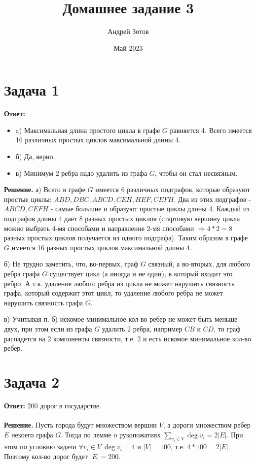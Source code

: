 \documentclass{article}
\title{Домашнее задание 3}
\author{Андрей Зотов}
\date{Май 2023}
\begin{document}
\maketitle

\section*{Задача 1}
{\bf Ответ:}
\begin{itemize}
\item a) Максимальная длина простого цикла в графе $G$ равняется 4. Всего имеется 16 различных простых циклов максимальной длины 4.
\item б) Да, верно.
\item в) Минимум 2 ребра надо удалить из графа $G$, чтобы он стал несвязным.
\end{itemize}
{\bf Решение.} а) Всего в графе $G$ имеется 6 различных подграфов, которые образуют простые циклы: $ABD, DBC, ABCD, CEH, HEF, CEFH$. Два из этих подграфов - $ABCD, CEFH$ - самые большие и образуют простые циклы длины 4. Каждый из подграфов длины 4 дает 8 разных простых циклов (стартовую вершину цикла можно выбрать 4-мя способами и направление 2-мя способами $\Rightarrow 4 * 2 = 8$ разных простых циклов получается из одного подграфа). Таким образом в графе $G$ имеется 16 разных простых циклов максимальной длины 4.
\par
б) Не трудно заметить, что, во-первых, граф $G$ связный, а во-вторых, для любого ребра графа $G$ существует цикл (а иногда и не один), в который входит это ребро. А т.к. удаление любого ребра из цикла не может нарушить связность графа, который содержит этот цикл, то удаление любого ребра не может нарушить связность графа $G$.
\par
в) Учитывая п. б) искомое минимальное кол-во ребер не может быть меньше двух, при этом если из графа $G$ удалить 2 ребра, например $CB$ и $CD$, то граф распадется на 2 компоненты связности, т.е. 2 и есть искомое минимальное кол-во ребер.
\section*{Задача 2}
{\bf Ответ:} 200 дорог в государстве.
\\
\\
{\bf Решение.} Пусть города будут множеством вершин $V$, а дороги множеством ребер $E$ некоего графа $G$. Тогда по лемме о рукопожатиях $\sum_{v_i \in V}\deg{v_i} = 2 |E|$. При этом по условию задачи $\forall v_i \in V\ \deg{v_i}=4$ и $|V|= 100$, т.е. $4*100=2|E|$. Поэтому кол-во дорог будет $|E|=200$.
\end{document}
